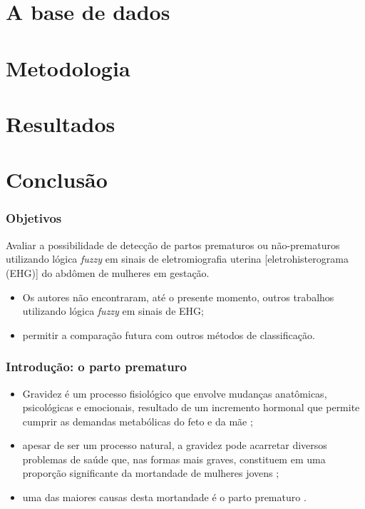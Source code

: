 \documentclass{beamer}
\begin{document}
\section{A base de dados} 



\section{Metodologia} 

\section{Resultados} 

\section{Conclus\~ao} 



\begin{frame}
\frametitle{Objetivos}

Avaliar a possibilidade de detecção de partos prematuros ou não-prematuros utilizando lógica {\em fuzzy} em sinais de eletromiografia uterina [eletrohisterograma (EHG)] do abdômen de mulheres em gestação.

\begin{itemize}
	\item Os autores não encontraram, até o presente momento, outros trabalhos utilizando lógica {\em fuzzy} em sinais de EHG;
	\item permitir a comparação futura com outros métodos de classificação.
\end{itemize}

\end{frame}


\begin{frame}
	\frametitle{Introdu\c{c}\~ao: o parto prematuro}	
	
	\begin{itemize}
		\item Gravidez é um processo fisiológico que envolve mudanças anatômicas, psicológicas e emocionais, resultado de um incremento hormonal que permite cumprir as demandas metabólicas do feto e da mãe \cite{p1};
		\item apesar de ser um processo natural, a gravidez pode acarretar diversos problemas de saúde que, nas formas mais graves, constituem em uma proporção significante da mortandade de mulheres jovens \cite{p2};
		\item uma das maiores causas desta mortandade é o parto prematuro \cite{p2}.
	\end{itemize}
	
\end{frame}
 
\end{document}
